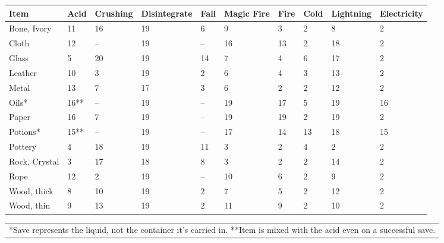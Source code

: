\noindent
\begin{minipage}{\columnwidth}

\label{itemsaves}
\noindent
\begin{tabular}{|p{}|p{}|p{}|p{}|p{}|p{}|p{}|p{}|p{}|p{}|}
\hline
Item	& Acid	& Crush\-ing	& Disin\-tegrate	& Fall	& Magic Fire	& Fire	& Cold	& Lightning	& Electricity \\
\hline\hline
\rowcolor[gray]{.9}Bone, Ivory		& 11	& 16	& 19	& 6	& 9	& 3	& 2	& 8	& 2 \\
Cloth			& 12	& --	& 19	& --	& 16	& 13	& 2	& 18	& 2 \\
\rowcolor[gray]{.9}Glass			& 5	& 20	& 19	& 14	& 7	& 4	& 6	& 17	& 2 \\
Leather			& 10	& 3	& 19	& 2	& 6	& 4	& 3	& 13	& 2 \\
\rowcolor[gray]{.9}Metal			& 13	& 7	& 17	& 3	& 6	& 2	& 2	& 12	& 2 \\
Oils*			& 16**	& --	& 19	& --	& 19	& 17	& 5	& 19	& 16 \\
\rowcolor[gray]{.9}Paper			& 16	& 7	& 19	& --	& 19	& 19	& 2	& 19	& 2 \\
Potions*		& 15**	& --	& 19	& --	& 17	& 14	& 13	& 18	& 15 \\
\rowcolor[gray]{.9}Pottery			& 4	& 18	& 19	& 11	& 3	& 2	& 4	& 2	& 2 \\
Rock, Crystal	& 3	& 17	& 18	& 8	& 3	& 2	& 2	& 14	& 2 \\
\rowcolor[gray]{.9}Rope			& 12	& 2	& 19	& --	& 10	& 6	& 2	& 9	& 2 \\
Wood, thick		& 8	& 10	& 19	& 2	& 7	& 5	& 2	& 12	& 2 \\
\rowcolor[gray]{.9}Wood, thin		& 9	& 13	& 19	& 2	& 11	& 9	& 2	& 10	& 2 \\
\hline
\end{tabular}
\noindent\begin{tabular}{p{}}
*Save represents the liquid, not the container it's carried in. \hspace{1em} **Item is mixed with the acid even on a successful save. \\
\end{tabular}\vspace{.5em}

\end{minipage}

